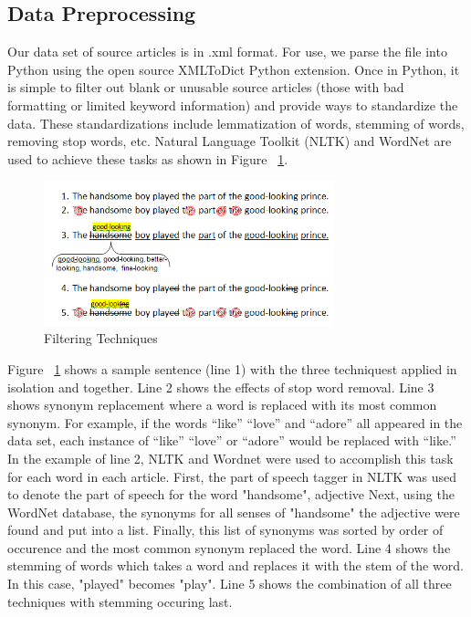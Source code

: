 \documentclass[11pt,letterpaper,oneside, titlepage]{scrartcl}
\begin{document}
\subsection{Data Preprocessing}

Our data set of source articles is in .xml format. For use, we parse the file into Python using the open source XMLToDict Python extension. Once in Python, it is simple to filter out blank or unusable source articles (those with bad formatting or limited keyword information) and provide ways to standardize the data. These standardizations include lemmatization of words, stemming of words, removing stop words, etc. Natural Language Toolkit (NLTK) and WordNet are used to achieve these tasks as shown in Figure ~\ref{fig:filtering}.

\begin{figure}[h!]
  \centering
  \includegraphics[width=0.75\textwidth]{filtering}
  \caption{Filtering Techniques}
  \label{fig:filtering}
\end{figure}

Figure ~\ref{fig:filtering} shows a sample sentence (line 1) with the three techniquest applied in isolation and together. Line 2 shows the effects of stop word removal. Line 3 shows synonym replacement where a word is replaced with its most common synonym. For example, if the words “like” “love” and “adore” all appeared in the data set, each instance of “like” “love” or “adore” would be replaced with “like.” In the example of line 2, NLTK and Wordnet were used to accomplish this task for each word in each article. First, the part of speech tagger in NLTK was used to denote the part of speech for the word "handsome", adjective Next, using the WordNet database, the synonyms for all senses of "handsome" the adjective were found and put into a list. Finally, this list of synonyms was sorted by order of occurence and the most common synonym replaced the word. Line 4 shows the stemming of words which takes a word and replaces it with the stem of the word. In this case, "played" becomes "play". Line 5 shows the combination of all three techniques with stemming occuring last.
\end{document}
